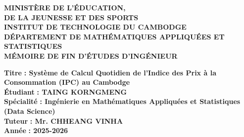 \begin{mdframed}[linewidth=1.5pt, roundcorner=5pt]
\begin{center}
\fontsize{15pt}{18pt}\selectfont \textbf{MINISTÈRE DE L'ÉDUCATION,\\
DE LA JEUNESSE ET DES SPORTS} \\
\vspace{0.4cm}
\fontsize{15pt}{18pt}\selectfont \textbf{INSTITUT DE TECHNOLOGIE DU CAMBODGE} \\
\vspace{0.4cm}
\fontsize{13pt}{15pt}\selectfont \textbf{DÉPARTEMENT DE MATHÉMATIQUES APPLIQUÉES ET STATISTIQUES} \\
\vspace{0.3cm}
\fontsize{14pt}{15pt}\selectfont \textbf{MÉMOIRE DE FIN D'ÉTUDES D'INGÉNIEUR} \\
\vspace{0.3cm}
    \begin{flushleft}
        \hspace{1cm}
        \fontsize{11pt}{13pt}\selectfont \textbf{Titre}
        \hspace{2.2cm}
        \fontsize{11pt}{13pt}\selectfont \textbf{: Système de Calcul Quotidien de l'Indice des Prix à la Consommation (IPC) au Cambodge} \\[.1cm]
        \hspace{1cm}
        \fontsize{11pt}{13pt}\selectfont \textbf{Étudiant}
        \hspace{1.7cm}
        \fontsize{11pt}{13pt}\selectfont \textbf{: TAING KORNGMENG} \\[.1cm]
        \hspace{1cm}
        \fontsize{11pt}{13pt}\selectfont \textbf{Spécialité}
        \hspace{1.45cm}
        \fontsize{11pt}{13pt}\selectfont \textbf{: Ingénierie en Mathématiques Appliquées et Statistiques (Data Science)} \\[.1cm]
        \hspace{1cm}
        \fontsize{11pt}{13pt}\selectfont \textbf{Tuteur}
        \hspace{2.05cm}
        \fontsize{11pt}{13pt}\selectfont \textbf{: Mr. CHHEANG VINHA} \\[.1cm]
        \hspace{1cm}
        \fontsize{11pt}{13pt}\selectfont \textbf{Année}
        \hspace{2.1cm}
        \fontsize{11pt}{13pt}\selectfont \textbf{: 2025-2026} \\
    \end{flushleft}
    \vspace{.3cm}
\end{center}
\end{mdframed}
